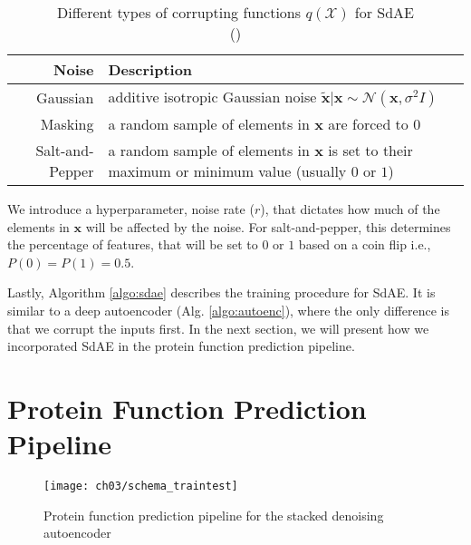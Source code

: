 \begin{table}[!h]
  \centering
  \caption[Different types of corrupting functions $q(\mathcal{X}) for SdAE$]
  {Different types of corrupting functions $q(\mathcal{X})$ for SdAE\\
  (\cite{vincent2010stacked})}
  \label{exp:noise_types}
  \begin{tabular}{@{}rp{}@{}}
      \toprule
      Noise            & Description                                                   \\ \midrule
      Gaussian         & additive isotropic Gaussian noise $\mathbf{\widetilde{x}} |
                         \mathbf{x} \sim \mathcal{N}(\mathbf{x}, \sigma^2 I)$          \\
      Masking          & a random sample of elements in $\mathbf{x}$ are forced to $0$ \\
      Salt-and-Pepper  & a random sample of elements in $\mathbf{x}$ is set to their
                         maximum or minimum value (usually $0$ or $1$)                 \\\bottomrule
  \end{tabular}
\end{table}

\par We introduce a hyperparameter, noise rate ($r$), that dictates how much of
the elements in $\mathbf{x}$ will be affected by the noise. For
salt-and-pepper, this determines the percentage of features, that will be set
to $0$ or $1$ based on a coin flip i.e., $P(0) = P(1) = 0.5$.


\par Lastly, Algorithm \ref{algo:sdae} describes the training procedure for SdAE.
It is similar to a deep autoencoder (Alg. \ref{algo:autoenc}), where the only difference
is that we corrupt the inputs first. In the next section, we will present how
we incorporated SdAE in the protein function prediction pipeline.



\section{Protein Function Prediction Pipeline}
\label{SDPipeline}

\begin{figure}[!t]
  \centering
  \texttt{[image: ch03/schema\_traintest]}
  \caption[Protein function prediction pipeline]{Protein function prediction
  pipeline for the stacked denoising autoencoder}
  \label{schema:traintest_sdae}
\end{figure}


